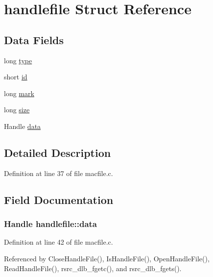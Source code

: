 \hypertarget{structhandlefile}{\section{handlefile Struct Reference}
\label{structhandlefile}
}
\subsection*{Data Fields}
\begin{DoxyCompactItemize}
\item 
long \hyperlink{structhandlefile_ad3e153e07879dc79c72298f014d63b2f}{type}
\item 
short \hyperlink{structhandlefile_ada05a2ea9513e0922b07222045f729d7}{id}
\item 
long \hyperlink{structhandlefile_ae18690c2b029210d24e13f88de05e8c4}{mark}
\item 
long \hyperlink{structhandlefile_ab368fa764be6648f2226c26452671a1a}{size}
\item 
Handle \hyperlink{structhandlefile_a328b5250c7fb68beb3f8d2977a50feb2}{data}
\end{DoxyCompactItemize}


\subsection{Detailed Description}


Definition at line 37 of file macfile.\+c.



\subsection{Field Documentation}
\hypertarget{structhandlefile_a328b5250c7fb68beb3f8d2977a50feb2}{
\subsubsection[{data}]{\setlength{\rightskip}{0pt plus 5cm}Handle handlefile\+::data}}\label{structhandlefile_a328b5250c7fb68beb3f8d2977a50feb2}


Definition at line 42 of file macfile.\+c.



Referenced by Close\+Handle\+File(), Is\+Handle\+File(), Open\+Handle\+File(), Read\+Handle\+File(), rsrc\+\_\+dlb\+\_\+fgetc(), and rsrc\+\_\+dlb\+\_\+fgets().


